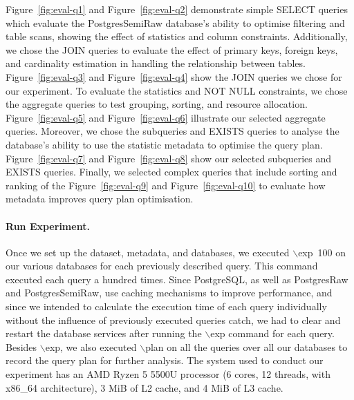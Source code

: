 Figure~\ref{fig:eval-q1} and Figure~\ref{fig:eval-q2} demonstrate simple SELECT queries which evaluate the PostgresSemiRaw database's ability to optimise filtering and table scans, showing the effect of statistics and column constraints. Additionally, we chose the JOIN queries to evaluate the effect of primary keys, foreign keys, and cardinality estimation in handling the relationship between tables. Figure~\ref{fig:eval-q3} and Figure~\ref{fig:eval-q4} show the JOIN queries we chose for our experiment. To evaluate the statistics and NOT NULL constraints, we chose the aggregate queries to test grouping, sorting, and resource allocation. Figure~\ref{fig:eval-q5} and Figure~\ref{fig:eval-q6} illustrate our selected aggregate queries. Moreover, we chose the subqueries and EXISTS queries to analyse the database's ability to use the statistic metadata to optimise the query plan. Figure~\ref{fig:eval-q7} and Figure~\ref{fig:eval-q8} show our selected subqueries and EXISTS queries. Finally, we selected complex queries that include sorting and ranking of the Figure~\ref{fig:eval-q9} and Figure~\ref{fig:eval-q10} to evaluate how metadata improves query plan optimisation.












\paragraph{Run Experiment.}
\label{par:eval-run-experiment}
Once we set up the dataset, metadata, and databases, we executed $\backslash$exp~100 on our various databases for each previously described query. This command executed each query a hundred times. Since PostgreSQL, as well as PostgresRaw and PostgresSemiRaw, use caching mechanisms to improve performance, and since we intended to calculate the execution time of each query individually without the influence of previously executed queries catch, we had to clear and restart the database services after running the $\backslash$exp command for each query. Besides $\backslash$exp, we also executed $\backslash$plan on all the queries over all our databases to record the query plan for further analysis. The system used to conduct our experiment has an AMD Ryzen 5 5500U processor (6 cores, 12 threads, with x86\_64 architecture), 3 MiB of L2 cache, and 4 MiB of L3 cache.

